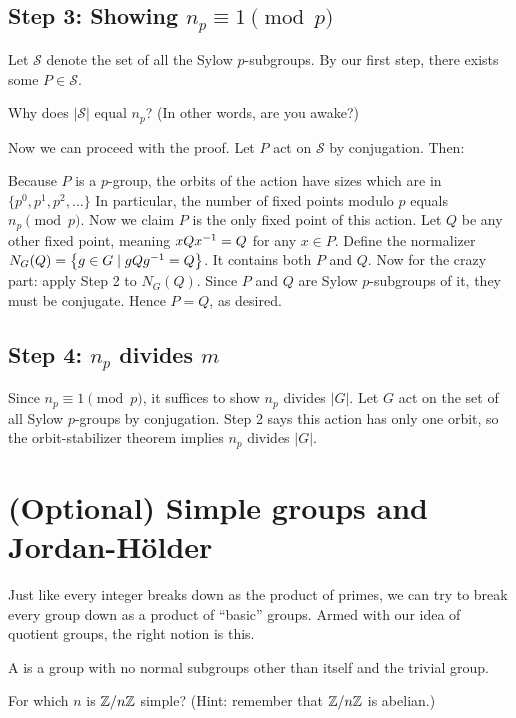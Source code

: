 \subsection{Step 3: Showing $n_p \equiv 1 \pmod p$}
Let $\mathcal S$ denote the set of all the Sylow $p$-subgroups. By our
first step, there exists some $P \in \mathcal S$.
\begin{ques}
	Why does $\left\lvert \mathcal S \right\rvert$ equal $n_p$?
	(In other words, are you awake?)
\end{ques}
Now we can proceed with the proof.
Let $P$ act on $\mathcal S$ by conjugation. Then:
\begin{itemize}
	\ii Because $P$ is a $p$-group,
  the orbits of the action have sizes which are in $\{p^0, p^1, p^2, \dots\}$
  In particular, the number of fixed points modulo $p$ equals $n_p \pmod p$.
	\ii Now we claim $P$ is the only fixed point of this action.
	\ii Let $Q$ be any other fixed point, meaning $xQx^{-1} = Q$ for any $x \in P$.
	\ii Define the normalizer $N_G(Q) = \left\{ g \in G \mid gQg^{-1} = Q \right\}$. It contains both $P$ and $Q$.
	\ii Now for the crazy part: apply Step 2 to $N_G(Q)$.
	Since $P$ and $Q$ are Sylow $p$-subgroups of it, they must be conjugate.
	\ii Hence $P=Q$, as desired.
\end{itemize}

\subsection{Step 4: $n_p$ divides $m$}
Since $n_p \equiv 1 \pmod p$, it suffices to show $n_p$ divides $\left\lvert G \right\rvert$.
Let $G$ act on the set of all Sylow $p$-groups by conjugation.
Step 2 says this action has only one orbit, so the orbit-stabilizer theorem
implies $n_p$ divides $\left\lvert G \right\rvert$.


\section{(Optional) Simple groups and Jordan-H\"older}
Just like every integer breaks down as the product of primes,
we can try to break every group down as a product of ``basic'' groups.
Armed with our idea of quotient groups, the right notion is this.

\begin{definition}
	A  is a group with no normal subgroups
	other than itself and the trivial group.
\end{definition}
\begin{ques}
	For which $n$ is $\mathbb Z/n\mathbb Z$ simple? (Hint: remember that $\mathbb Z/n\mathbb Z$ is abelian.)
\end{ques}

